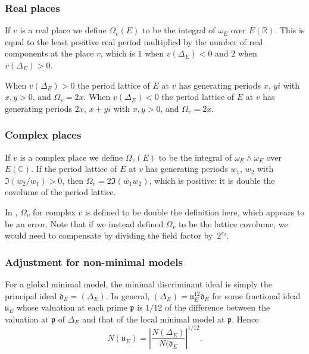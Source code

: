 \documentclass{amsart}
\newcommand\R{\mathbb{R}}
\newcommand\C{\mathbb{C}}
\begin{document}
\subsubsection{Real places}\label{at-a-real-place}

If \(v\) is a real place we define \(\Omega_v(E)\) to be the integral
of \(\omega_E\) over \(E(\R)\). This is equal to the least positive
real period multiplied by the number of real components at the place
\(v\), which is \(1\) when \(v(\Delta_E)<0\) and \(2\) when
\(v(\Delta_E)>0\).

When \(v(\Delta_E)>0\) the period lattice of \(E\) at \(v\) has
generating periods \(x\), \(yi\) with \(x,y>0\), and \(\Omega_v=2x\).
When \(v(\Delta_E)<0\) the period lattice of \(E\) at \(v\) has
generating periods \(2x\), \(x+yi\) with \(x,y>0\), and \(\Omega_v=2x\).

\subsubsection{Complex places}\label{at-a-complex-place}

If \(v\) is a complex place we define \(\Omega_v(E)\) to be the integral
of \(\omega_E\wedge\overline{\omega_E}\) over \(E(\C)\). If the period
lattice of \(E\) at \(v\) has generating periods \(w_1\), \(w_2\) with
\(\Im(w_2/w_1)>0\), then \(\Omega_v=2\Im(\overline{w_1}w_2)\), which
is positive: it is double the covolume of the period lattice.

In \cite{Dok}, \(\Omega_v\) for complex \(v\) is defined to be double
the definition here, which appears to be an error.  Note that if we
instead defined $\Omega_v$ to be the lattice covolume, we would need
to compensate by dividing the field factor by~$2^{r_2}$.

\subsubsection{Adjustment for non-minimal models}\label{adjustment-for-non-minimal-models}

For a global minimal model, the minimal discriminant ideal is simply the
principal ideal \(\mathfrak{d}_E=(\Delta_E)\). In general,
\((\Delta_E)=\mathfrak{u}_E^{12}\mathfrak{d}_E\) for some fractional
ideal \(\mathfrak{u}_E\) whose valuation at each prime \(\mathfrak{p}\) is
\(1/12\) of the difference between the valuation at \(\mathfrak{p}\) of
\(\Delta_E\) and that of the local minimal model at \(\mathfrak{p}\).
Hence
\[
N(\mathfrak{u}_E) =  \left|\frac{N(\Delta_E)}{N(\mathfrak{d}_E}\right|^{1/12}.
\]
\end{document}
